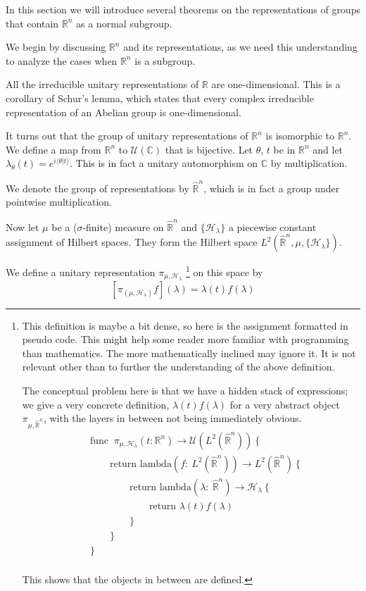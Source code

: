 \documentclass[
  12pt
]{article}
\numberwithin{equation}{section}
\theoremstyle{plain}
\newcommand{\bbr}{\ensuremath{\mathbb{R}}\xspace}
\newcommand{\hilb}{\ensuremath{\mathscr{H}}\xspace}
\begin{document}
  In this section we will introduce several theorems on the representations of
  groups that contain $\bbr^n$ as a normal subgroup.

  We begin by discussing $\bbr^n$ and its representations, as we need this understanding to analyze the cases when $\bbr^n$ is a subgroup.

  All the irreducible unitary representations of \bbr are one-dimensional.
  This is a corollary of Schur's lemma, which states that every complex
  irreducible representation of an Abelian group is one-dimensional.

  It turns out that the group of unitary representations of $\mathbb{R}^n$ is
  isomorphic to $\mathbb{R}^n$. We define a map from $\mathbb{R}^n$ to
  $\mathcal{U}(\mathbb{C})$ that is bijective. Let $\theta$, $t$ be in
  $\mathbb{R}^n$ and let $\lambda_{\theta}(t) = e^{i\langle \theta | t
  \rangle}$. This is in fact a unitary automorphism on $\mathbb{C}$ by
  multiplication.

  We denote the group of representations by $\hat{\mathbb{R}}^n$, which
  is in fact a group under pointwise multiplication.

  Now let $\mu$ be a ($\sigma$-finite) measure on $\hat{\bbr}^n$ and
  $\{\hilb_{\lambda}\}$ a piecewise constant assignment of Hilbert spaces. They
  form the Hilbert space $L^2(\hat{\bbr}^n, \mu, \{\hilb_{\lambda}\})$.

  We define a unitary representation $\pi_{\mu, \hilb_{\lambda}}$
  \footnote{
    This definition is maybe a bit dense, so here is the assignment formatted in
    pseudo code. This might help some reader more familiar with programming than
    mathematics. The more mathematically inclined may ignore it. It is not
    relevant other than to further the understanding of the above definition.

    The conceptual problem here is that we have a hidden stack of expressions; we
    give a very concrete definition, $\lambda(t)f(\lambda)$ for a very abstract
    object $\pi_{\mu, \hat{\bbr}^n}$, with the layers in between not being
    immediately obvious.
    \begin{align*}
      & \text{func }\ \pi_{\mu,\mathscr{H}_{\lambda}}(t: \mathbb{R}^n) \rightarrow \mathcal{U}(L^2(\hat{\mathbb{R}}^n)) \ \{ \\
      & \qquad \text{return lambda}(f:\ L^2(\hat{\mathbb{R}}^n)) \rightarrow L^2(\hat{\mathbb{R}}^n) \ \{ \\
      & \qquad \qquad \text{return lambda}(\lambda:\ \hat{\mathbb{R}}^n) \rightarrow \mathscr{H}_{\lambda} \ \{ \\
      & \qquad \qquad \qquad \text{return }\lambda(t)f(\lambda) \\
      & \qquad \qquad \} \\
      & \qquad \} \\
      & \} \\
    \end{align*}

    This shows that the objects in between are defined.
  }
  on this space by
  $$
    [\pi_{(\mu, \hilb_{\lambda})} f](\lambda) = \lambda(t)f(\lambda)
  $$
\end{document}
